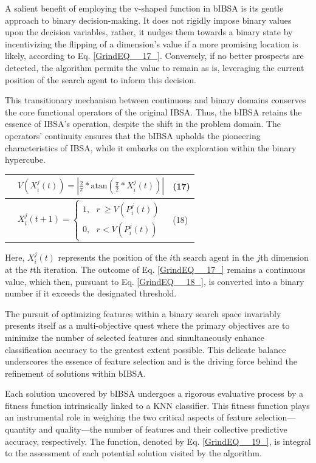 \documentclass{article} %
\begin{document}
A salient benefit of employing the v-shaped function in bIBSA is its gentle approach to binary decision-making. It does not rigidly impose binary values upon the decision variables, rather, it nudges them towards a binary state by incentivizing the flipping of a dimension's value if a more promising location is likely, according to Eq. \eqref{GrindEQ__17_}. Conversely, if no better prospects are detected, the algorithm permits the value to remain as is, leveraging the current position of the search agent to inform this decision.

This transitionary mechanism between continuous and binary domains conserves the core functional operators of the original IBSA. Thus, the bIBSA retains the essence of IBSA's operation, despite the shift in the problem domain. The operators' continuity ensures that the bIBSA upholds the pioneering characteristics of IBSA, while it embarks on the exploration within the binary hypercube.

\begin{tabular}{|p{0.4in}|p{2.9in}|p{0.5in}|} \hline 
 & $V\left(X^j_i\left(t\right)\right)=\left|\frac{2}{π}*\mathrm{atan}\mathrm{}(\frac{π}{2}*X^j_i\left(t\right))\right|$ & (17) \\ \hline 
 & $X^j_i\left(t+1\right)\mathrm{=}\left\{ \begin{array}{c}
1\mathrm{,\ \ }\ r\ \ge V\left(P^j_i\left(t\right)\right) \\ 
0\mathrm{,\ \ }\ r<V\left(P^j_i\left(t\right)\right) \end{array}
\right.$ & (18) \\ \hline 
\end{tabular}

Here, $X^j_i\left(t\right)$ represents the position of the $i$th search agent in the $j$th dimension at the $t$th iteration. The outcome of Eq. \eqref{GrindEQ__17_} remains a continuous value, which then, pursuant to Eq. \eqref{GrindEQ__18_}, is converted into a binary number if it exceeds the designated threshold.

The pursuit of optimizing features within a binary search space invariably presents itself as a multi-objective quest where the primary objectives are to minimize the number of selected features and simultaneously enhance classification accuracy to the greatest extent possible. This delicate balance underscores the essence of feature selection and is the driving force behind the refinement of solutions within bIBSA.

Each solution uncovered by bIBSA undergoes a rigorous evaluative process by a fitness function intrinsically linked to a KNN classifier. This fitness function plays an instrumental role in weighing the two critical aspects of feature selection---quantity and quality---the number of features and their collective predictive accuracy, respectively. The function, denoted by Eq. \eqref{GrindEQ__19_}, is integral to the assessment of each potential solution visited by the algorithm.
\end{document}

